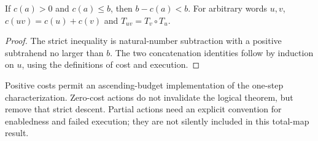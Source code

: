 \begin{lemma}\label{lem:budget-descent}
If $c(a)>0$ and $c(a)\le b$, then $b-c(a)<b$.
For arbitrary words $u,v$, $c(uv)=c(u)+c(v)$ and
$T_{uv}=T_v\circ T_u$.
\end{lemma}
\begin{proof}
The strict inequality is natural-number subtraction with a positive
subtrahend no larger than $b$. The two concatenation identities follow
by induction on $u$, using the definitions of cost and execution.
\end{proof}

Positive costs permit an ascending-budget implementation of the
one-step characterization. Zero-cost actions do not invalidate the
logical theorem, but remove that strict descent. Partial actions need
an explicit convention for enabledness and failed execution; they are
not silently included in this total-map result.
